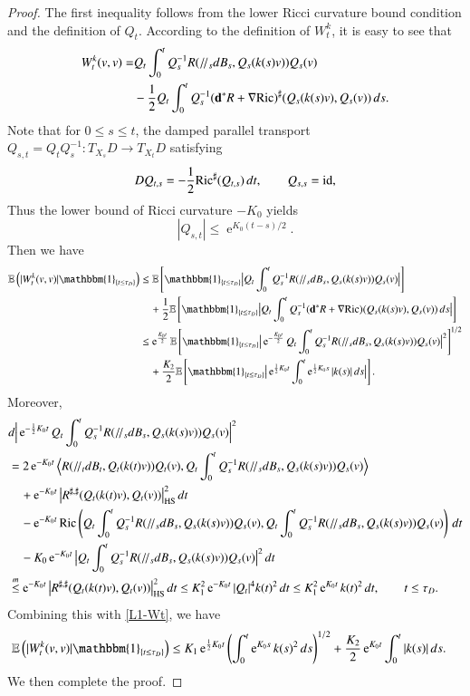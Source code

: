 \documentclass[11pt,reqno]{amsart}
\theoremstyle{definition} \newtheorem{remark}[theorem]{Remark}
\numberwithin{equation}{section}
\def\Ric{{\operatorname{Ric}}} \def\Hess{\operatorname{Hess}}
\newcommand\1{\mathbbm{1}}
\def\Ric{{\operatorname{Ric}}} \def\Aut{{\operatorname{Aut}}}
\def\mathpal#1{\mathop{\mathchoice{\text{\rm #1}}%
    {\text{\rm #1}}{\text{\rm #1}}%
    {\text{\rm #1}}}\nolimits} \def\id{{\mathpal{id}}}
\def\bd{{\bf d}}
\def\r{\right}
\def\l{\left} \def\e{\operatorname{e}} \def\dsum{\displaystyle\sum}
\newcommand{\ptr}{/\!/}
\def\id{{\mathpal{id}}}
\def\mathpal#1{\mathop{\mathchoice{\text{\rm #1}}%
      {\text{\rm #1}}{\text{\rm #1}}%
      {\text{\rm #1}}}\nolimits}
\begin{document}
\begin{proof}
The first inequality follows from the lower Ricci curvature bound condition and the definition of $Q_t$.
According to the definition of $W_t^k$, it is easy to see that 
\begin{align*}
W_t^k(v,v)=&Q_t\int_0^t Q_s^{-1} R(\ptr_s d B_s, Q_s(k(s)v))Q_s(v)\\
&-\frac{1}{2}Q_t\int_0^tQ_s^{-1}(\bd^*R+\nabla \Ric)^{\sharp}(Q_s(k(s)v), Q_s(v))\, ds.
\end{align*}
Note that for $0\leq s\leq t$, the damped parallel transport $Q_{s,t}=Q_{t}Q_s^{-1}\colon T_{X_s}D \rightarrow T_{X_t}D$ satisfying 
\begin{align*}
DQ_{t,s}=-\frac{1}{2}\Ric^{\sharp}(Q_{t,s})\, dt, \qquad Q_{s,s}=\id,
\end{align*}
Thus the lower bound of Ricci curvature  $-K_0$  yields
$$|Q_{s,t}|\leq \e^{K_0(t-s)/2}.$$
Then we have
\begin{align}\label{L1-Wt}
\E\l(|W_t^k(v,v)| \1_{\{t\leq \tau_D\}}\r) 
&\leq \E\l[\1_{\{t\leq \tau_D\}} \big|Q_t\int_0^t Q_s^{-1} R(\ptr_s d B_s, Q_s(k(s)v))Q_s(v)\big|\r] \notag\\
&\quad + \frac{1}{2} \E\l[\1_{\{t\leq \tau_D\}}\big|Q_t\int_0^tQ_s^{-1}(\bd^*R+\nabla \Ric)(Q_s(k(s)v), Q_s(v))\, ds\big| \r] \notag\\
&\leq  \e^{\frac{K_0t}{2}} \E\l[\1_{\{t\leq \tau_D\}} \big| \e^{-\frac{K_0t}{2}}Q_t\int_0^t Q_s^{-1} R(\ptr_s d B_s, Q_s(k(s)v))Q_s(v)\big|^2\r] ^{1/2} \notag\\
&\quad + \frac{K_2}{2} \E\l[\1_{\{t\leq \tau_D\}}\big|\e^{\frac{1}{2}K_0t}\int_0^t\e^{\frac{1}{2}K_0s}|k(s)|\, ds\big| \r]. 
\end{align}
Moreover, 
\begin{align*}
&  d \Big|\e^{-\frac{1}{2}K_0t }Q_t\int_0^t Q_s^{-1} R(\ptr_s d B_s, Q_s(k(s)v))Q_s(v)\Big|^2\\
  &=2\e^{-K_0t}\Big\langle R(\ptr_t d B_t,Q_t(k(t)v))Q_t(v), Q_t\int_0^t Q_s^{-1} R(\ptr_s d B_s, Q_s(k(s)v))Q_s(v)\Big\rangle\\
&\quad+\e^{-K_0t}\big|R^{\sharp,\sharp}(Q_t(k(t)v), Q_t(v))\big |_{\rm HS}^2\, d t\\
&\quad-\e^{-K_0t}\Ric\l(Q_t\int_0^t Q_s^{-1} R(\ptr_s d B_s, Q_s(k(s)v))Q_s(v), Q_t\int_0^t Q_s^{-1} R(\ptr_s d B_s, Q_s(k(s)v))Q_s(v)\r)\,d t \\
&\quad-K_0\e^{-K_0t}\big|Q_t\int_0^t Q_s^{-1} R(\ptr_s d B_s, Q_s(k(s)v))Q_s(v)\big|^2\, dt \\
& \overset{m}{\leq } \e^{-K_0t}\big|R^{\sharp,\sharp}(Q_t(k(t)v),Q_t(v))\big|_{\rm HS}^2\, d t\leq K_1^2\e^{-K_0t}|Q_t|^4 k(t)^2 \, d t\leq K_1^2\e^{K_0t}k(t)^2 \, d t, \qquad    t\leq \tau_D.
\end{align*}
Combining this with  \eqref{L1-Wt},  we have 
\begin{align*}
\E\l(|W_t^k(v,v)| \1_{\{t\leq \tau_D\}}\r) 
& \leq K_1 \e^{\frac{1}{2}K_0t} \l(\int_0^t \e^{K_0s}k(s)^2\, ds\r)^{1/2} +\frac{K_2}{2} \e^{K_0t}  \int_0^t|k(s)|\,ds.
\end{align*}
We then complete the proof.
\end{proof}
\end{document}
